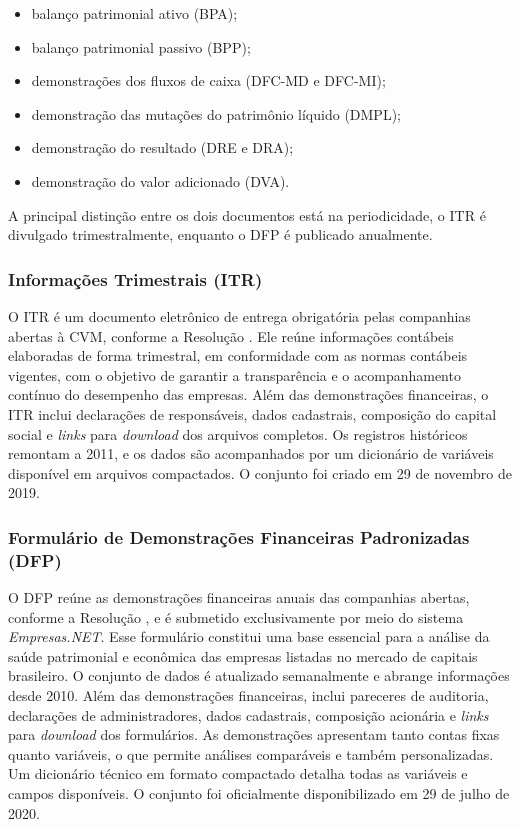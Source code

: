 \documentclass[recuosum=1.5cm]{iftex2024}
\begin{document}
\begin{itemize}
	\item balanço patrimonial ativo (BPA);
	\item balanço patrimonial passivo (BPP);
	\item demonstrações dos fluxos de caixa (DFC-MD e DFC-MI);
	\item demonstração das mutações do patrimônio líquido (DMPL);
	\item demonstração do resultado (DRE e DRA);
	\item demonstração do valor adicionado (DVA).
\end{itemize}

A principal distinção entre os dois documentos está na periodicidade, o ITR é divulgado trimestralmente, enquanto o DFP é publicado anualmente.

\subsubsection{Informações Trimestrais (ITR)}

O ITR é um documento eletrônico de entrega obrigatória pelas companhias abertas à CVM, conforme a Resolução \citet{cvm:2022:resolucao}. Ele reúne informações contábeis elaboradas de forma trimestral, em conformidade com as normas contábeis vigentes, com o objetivo de garantir a transparência e o acompanhamento contínuo do desempenho das empresas. Além das demonstrações financeiras, o ITR inclui declarações de responsáveis, dados cadastrais, composição do capital social e \textit{links} para \textit{download} dos arquivos completos. Os registros históricos remontam a 2011, e os dados são acompanhados por um dicionário de variáveis disponível em arquivos compactados. O conjunto foi criado em 29 de novembro de 2019.

\subsubsection{Formulário de Demonstrações Financeiras Padronizadas (DFP)}

O DFP reúne as demonstrações financeiras anuais das companhias abertas, conforme a Resolução \citet{cvm:2022:resolucao}, e é submetido exclusivamente por meio do sistema \textit{Empresas.NET}. Esse formulário constitui uma base essencial para a análise da saúde patrimonial e econômica das empresas listadas no mercado de capitais brasileiro. O conjunto de dados é atualizado semanalmente e abrange informações desde 2010. Além das demonstrações financeiras, inclui pareceres de auditoria, declarações de administradores, dados cadastrais, composição acionária e \textit{links} para \textit{download} dos formulários. As demonstrações apresentam tanto contas fixas quanto variáveis, o que permite análises comparáveis e também personalizadas. Um dicionário técnico em formato compactado detalha todas as variáveis e campos disponíveis. O conjunto foi oficialmente disponibilizado em 29 de julho de 2020.
\end{document}
